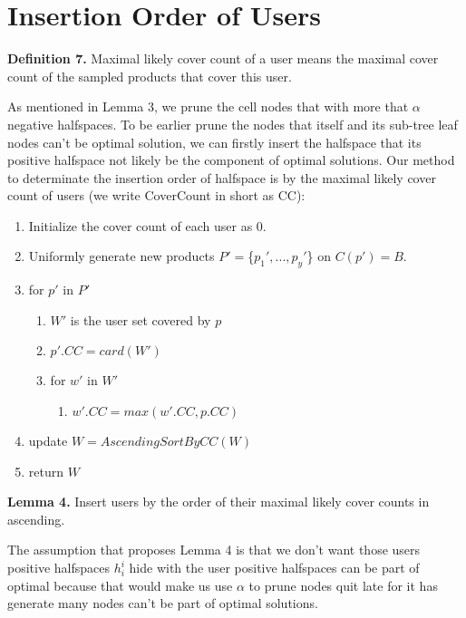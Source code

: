 \section{Insertion Order of Users}

{\bfseries Definition 7.} Maximal likely cover count of a user means  
the maximal cover count of the sampled products that cover this user.

As mentioned in Lemma 3, we prune the cell nodes that with more that $\alpha$ 
negative halfspaces. 
To be earlier prune the nodes that itself and its sub-tree leaf nodes can't be 
optimal solution,
we can firstly insert the halfspace that its positive halfspace not likely be 
the component of optimal solutions.
Our method to determinate the insertion order of halfspace is by the maximal 
likely cover count of users (we write CoverCount in short as CC):

\begin{enumerate}
  \item Initialize the cover count of each user as 0.
  \item Uniformly generate new products $P'=$\{$p_{1}', ..., p_{y}'$\} on $C(p')=B$.
  \item for $p'$ in $P'$ 
  \begin{enumerate}
    \item $W'$ is the user set covered by $p$
    \item $p'.CC=card(W')$
    \item for $w'$ in $W'$
    \begin{enumerate}
      \item $w'.CC=max(w'.CC, p.CC)$
    \end{enumerate}
  \end{enumerate}
  \item update $W=AscendingSortByCC(W)$
  \item return $W$
\end{enumerate}


{\bfseries Lemma 4.} Insert users by the order of their maximal likely cover counts in ascending.

The assumption that proposes Lemma 4 is that we don't want those users positive 
halfspaces $h_i^i$
hide with the user positive halfspaces can be part of optimal because that would make 
us use $\alpha$ to prune nodes quit late for it has generate many nodes can't be
part of optimal solutions. 




